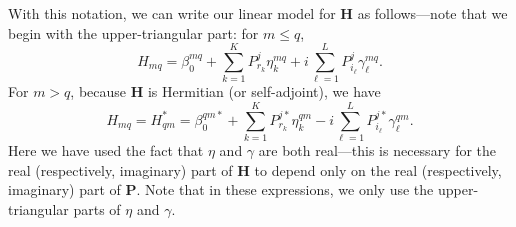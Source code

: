 \documentclass[10pt]{article}
\begin{document}
With this notation, we can write our linear model for $\mathbf{H}$ as follows---note that we begin with the upper-triangular part: for $m \leq q$,
\begin{equation}
\label{eqn:Hupper}
H_{mq} = \beta_0^{mq} + \sum_{k=1}^K P^j_{r_k} \eta_k^{mq} + i \sum_{\ell=1}^L P^j_{i_{\ell}} \gamma_{\ell}^{mq}.
\end{equation}
For $m > q$, because $\mathbf{H}$ is Hermitian (or self-adjoint), we have
\begin{equation}
\label{eqn:Hlower}
H_{mq} = H_{qm}^{\ast} = \beta_0^{qm\ast} + \sum_{k=1}^K P^{j\ast}_{r_k} \eta_k^{qm} - i \sum_{\ell=1}^L P^{j\ast}_{i_{\ell}} \gamma_{\ell}^{qm}.
\end{equation}
Here we have used the fact that $\eta$ and $\gamma$ are both real---this is necessary for the real (respectively, imaginary) part of $\mathbf{H}$ to depend only on the real (respectively, imaginary) part of $\mathbf{P}$.  Note that in these expressions, we only use the upper-triangular parts of $\eta$ and $\gamma$.
\end{document}
